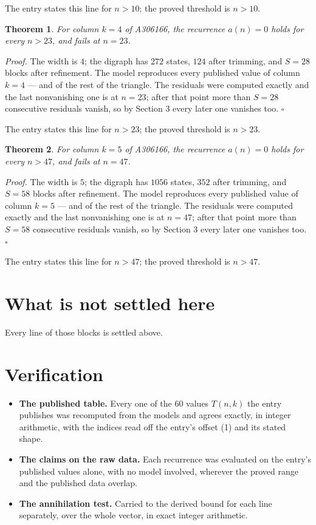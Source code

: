 \documentclass[11pt]{article}
\newtheorem{theorem}{Theorem}
\theoremstyle{definition}
\begin{document}
The entry states this line for $n > 10$; the proved threshold is $n > 10$.

\begin{theorem} For column $k = 4$ of A306166, the recurrence $a(n) = 0$ holds for every $n > 23$, and fails at $n = 23$.\end{theorem}

{\itshape Proof.} The width is $4$; the digraph has $272$ states, $124$ after trimming, and $S = 28$ blocks after refinement. The model reproduces every published value of column $k = 4$ --- and of the rest of the triangle. The residuals were computed exactly and the last nonvanishing one is at $n = 23$; after that point more than $S = 28$ consecutive residuals vanish, so by Section 3 every later one vanishes too. $\square$

The entry states this line for $n > 23$; the proved threshold is $n > 23$.

\begin{theorem} For column $k = 5$ of A306166, the recurrence $a(n) = 0$ holds for every $n > 47$, and fails at $n = 47$.\end{theorem}

{\itshape Proof.} The width is $5$; the digraph has $1056$ states, $352$ after trimming, and $S = 58$ blocks after refinement. The model reproduces every published value of column $k = 5$ --- and of the rest of the triangle. The residuals were computed exactly and the last nonvanishing one is at $n = 47$; after that point more than $S = 58$ consecutive residuals vanish, so by Section 3 every later one vanishes too. $\square$

The entry states this line for $n > 47$; the proved threshold is $n > 47$.

\section{What is not settled here}

Every line of those blocks is settled above.

\section{Verification}

\begin{itemize}

\item {\bfseries The published table.} Every one of the 60 values $T(n,k)$ the entry publishes was recomputed from the models and agrees exactly, in integer arithmetic, with the indices read off the entry's offset (1) and its stated shape.

\item {\bfseries The claims on the raw data.} Each recurrence was evaluated on the entry's published values alone, with no model involved, wherever the proved range and the published data overlap.

\item {\bfseries The annihilation test.} Carried to the derived bound for each line separately, over the whole vector, in exact integer arithmetic.

\end{itemize}
\end{document}
